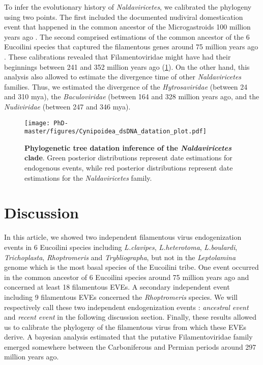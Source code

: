 To infer the evolutionary history of \textit{Naldaviricetes}, we calibrated the phylogeny using two points. The first included the documented nudiviral domestication event that happened in the common ancestor of the Microgastroids 100 million years ago \citep{whitfield_virus_2003, bezier_bracovirus_2008, murphy_phylogeny_2008}. The second comprised estimations of the common ancestor of the 6 Eucoilini species that captured the filamentous genes around 75 million years ago \citep{blaimer_comprehensive_2020}. These calibrations revealed that Filamentoviridae might have had their beginnings between 241 and 352 million years ago (\figurename{\ref{figure:Cynipoidea_dsDNA_datation_plot}}). On the other hand, this analysis also allowed to estimate the divergence time of other \textit{Naldaviricetes} families. Thus, we estimated the divergence of the \textit{Hytrosaviridae} (between 24 and 310 mya), the \textit{Baculoviridae} (between 164 and 328 million years ago, and the \textit{Nudiviridae} (between 247 and 346 mya).


\begin{figure}[!htpbt]
\texttt{[image: PhD-master/figures/Cynipoidea\_dsDNA\_datation\_plot.pdf]}\centering
\caption[Paper3:\textit{Naldaviricetes} dated phylogeny including Eucoilini]{\textbf{Phylogenetic tree datation inference of the \textit{Naldaviricetes} clade}. Green posterior distributions represent date estimations for endogenous events, while red posterior distributions represent date estimations for the \textit{Naldaviricetes} family.}
\label{figure:Cynipoidea_dsDNA_datation_plot}
\end{figure}


\section{Discussion}

In this article, we showed two independent filamentous virus endogenization events in 6 Eucoilini species including \textit{L.clavipes}, \textit{L.heterotoma}, \textit{L.boulardi}, \textit{Trichoplasta}, \textit{Rhoptromeris} and \textit{Trybliographa}, but not in the \textit{Leptolamina} genome which is the most basal species of the Eucoilini tribe. One event occurred in the common ancestor of 6 Eucoilini species around 75 million years ago and concerned at least 18 filamentous EVEs. A secondary independent event including 9 filamentous EVEs concerned the \textit{Rhoptromeris} species. We will respectively call these two independent endogenization events : \textit{ancestral event} and \textit{recent event} in the following discussion section. Finally, these results allowed us to calibrate the phylogeny of the filamentous virus from which these EVEs derive. A bayesian analysis estimated that the putative Filamentoviridae family emerged somewhere between the Carboniferous and Permian periods around 297 million years ago.  \\

